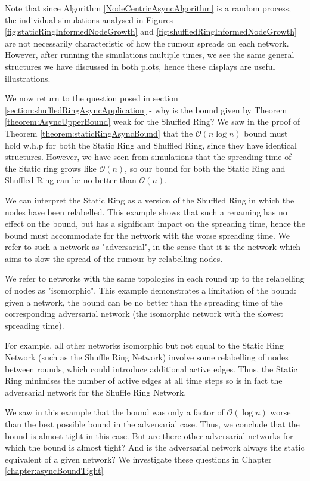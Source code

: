 Note that since Algorithm \ref{NodeCentricAsyncAlgorithm} is a random process, the individual simulations analysed in Figures \ref{fig:staticRingInformedNodeGrowth} and \ref{fig:shuffledRingInformedNodeGrowth} are not necessarily characteristic of how the rumour spreads on each network. However, after running the simulations multiple times, we see the same general structures we have discussed in both plots, hence these displays are useful illustrations.

We now return to the question posed in section \ref{section:shuffledRingAsyncApplication} - why is the bound given by Theorem \ref{theorem:AsyncUpperBound} weak for the Shuffled Ring? We saw in the proof of Theorem \ref{theorem:staticRingAsyncBound} that the $\mathcal{O}(n \log n)$ bound must hold w.h.p for both the Static Ring and Shuffled Ring, since they have identical structures. However, we have seen from simulations that the spreading time of the Static ring grows like $\mathcal{O}(n)$, so our bound for both the Static Ring and Shuffled Ring can be no better than $\mathcal{O}(n)$. 

We can interpret the Static Ring as a version of the Shuffled Ring in which the nodes have been relabelled. This example shows that such a renaming has no effect on the bound, but has a significant impact on the spreading time, hence the bound must accommodate for the network with the worse spreading time. We refer to such a network as "adversarial", in the sense that it is the network which aims to slow the spread of the rumour by relabelling nodes.

We refer to networks with the same topologies in each round up to the relabelling of nodes as "isomorphic". This example demonstrates a limitation of the bound: given a network, the bound can be no better than the spreading time of the corresponding adversarial network (the isomorphic network with the slowest spreading time).

For example, all other networks isomorphic but not equal to the Static Ring Network (such as the Shuffle Ring Network) involve some relabelling of nodes between rounds, which could introduce additional active edges. Thus, the Static Ring minimises the number of active edges at all time steps so is in fact the adversarial network for the Shuffle Ring Network. 

We saw in this example that the bound was only a factor of $\mathcal{O}(\log n)$ worse than the best possible bound in the adversarial case. Thus, we conclude that the bound is almost tight in this case. But are there other adversarial networks for which the bound is almost tight? And is the adversarial network always the static equivalent of a given network? We investigate these questions in Chapter \ref{chapter:asyncBoundTight}


